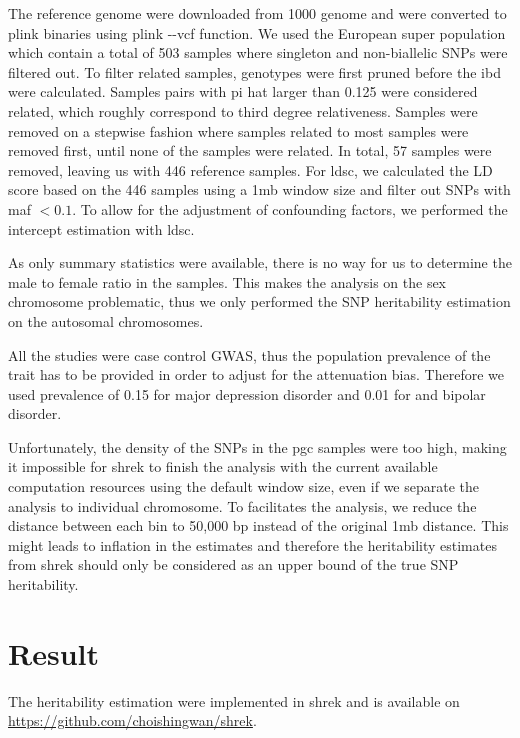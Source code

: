 	The reference genome were downloaded from 1000 genome \citep{Project2012} and were converted to plink binaries using plink -{}-vcf function. 
	We used the European super population which contain a total of 503 samples where singleton and non-biallelic \glspl{SNP} were filtered out.
	To filter related samples, genotypes were first pruned before the \gls{ibd} were calculated.
	Samples pairs with pi hat larger than 0.125 were considered related, which roughly correspond to third degree relativeness. 
	Samples were removed on a stepwise fashion where samples related to most samples were removed first, until none of the samples were related. 
	In total, 57 samples were removed, leaving us with 446 reference samples. 
	For \gls{ldsc}, we calculated the \gls{LD} score based on the 446 samples using a 1\gls{mb} window size and filter out \glspl{SNP} with \gls{maf} $<0.1$.
	To allow for the adjustment of confounding factors, we performed the intercept estimation with \gls{ldsc}.
	
	As only summary statistics were available, there is no way for us to determine the male to female ratio in the samples. 
	This makes the analysis on the sex chromosome problematic, thus we only performed the \gls{SNP} heritability estimation on the autosomal chromosomes.
	
	All the studies were case control \gls{GWAS}, thus the population prevalence of the trait has to be provided in order to adjust for the attenuation bias. 
	Therefore we used prevalence of 0.15 for major depression disorder and 0.01 for  and bipolar disorder.

	Unfortunately, the density of the \glspl{SNP} in the \gls{pgc}  samples were too high, making it  impossible for \gls{shrek} to finish the analysis with the current available computation resources using the default window size, even if we separate the analysis to individual chromosome.
	To facilitates the analysis, we reduce the distance between each bin to 50,000 bp instead of the original 1\gls{mb} distance. 
	This might leads to inflation in the estimates and therefore the heritability estimates from \gls{shrek} should only be considered as an upper bound of the true \gls{SNP} heritability.
	
	
	\section{Result}
		The heritability estimation were implemented in \gls{shrek} and is available on \url{https://github.com/choishingwan/shrek}.  
